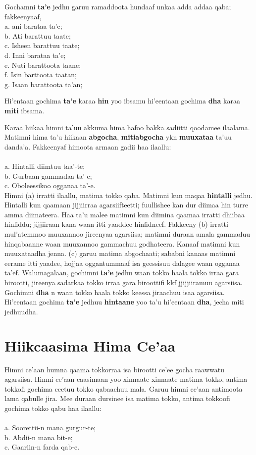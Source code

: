 \documentclass[11pt,b5paper]{book}
\begin{document}
Gochamni \textbf{ta’e} jedhu garuu ramaddoota hundaaf unkaa adda
addaa qaba; fakkeenyaaf,\\
a. ani barataa ta'e;\\
b. Ati barattuu taate;\\
c. Isheen barattuu taate;\\
d. Inni barataa ta'e;\\
e. Nuti barattoota taane;\\
f. Isin barttoota taatan;\\
g. Isaan barattoota ta'an;

 
Hi'entaan gochima \textbf{ta’e} karaa \textbf{hin} yoo ibsamu hi'eentaan gochima \textbf{dha} karaa \textbf{miti} ibsama. 

Karaa hiikaa himni ta’uu akkuma hima hafoo bakka sadiitti qoodamee ilaalama. Matimni hima ta’u hiikaan \textbf{abgocha}, \textbf{mitiabgocha} ykn \textbf{muuxataa} ta’uu danda’a. Fakkeenyaf himoota
armaan gadii haa ilaallu:  \\
\\
a. Hintalli diimtuu taa’-te;\\
b. Gurbaan gammadaa ta’-e;\\
c. Oboleessikoo ogganaa ta’-e.\\

Himni (a) irratti ilaallu, matima tokko qaba. Matimni kun maqaa \textbf{hintalli} jedhu. Hintalli kun qaamaan jijjiirraa agarsiifteetti; fuullishee kan dur diimaa hin turre amma diimateera. Haa ta’u malee matimni kun diimina qaamaa irratti dhiibaa hinfiddu; jijjiiraan kana waan itti yaaddee hinfidneef. Fakkeeny (b) irratti mul’atemmoo muuxannoo jireenyaa agarsiisa; matimni duraan amala gammaduu hinqabaanne waan muuxannoo gammachuu godhateera. Kanaaf matimni kun muuxataadha jenna. (c) garuu matima abgochaati; sababni kanaas matimni eerame itti yaadee, hojjaa oggantummaaf isa geessisuu dalagee waan ogganaa ta’ef. Walumagalaan, gochimni \textbf{ta’e} jedhu waan tokko haala tokko irraa gara birootti, jireenya sadarkaa tokko irraa gara biroottifi kkf jjijjiiramuu agarsiisa. Gochimni \textbf{dha} n waan
tokko haala tokko keessa jiraachuu isaa agarsiisa. Hi'eentaan gochima \textbf{ta’e} jedhuu \textbf{hintaane} yoo ta’u hi'eentaan \textbf{dha}, jecha miti jedhuudha.

\section{Hiikcaasima Hima Ce'aa}

Himni ce’aan humna qaama tokkorraa isa birootti ce’ee gocha raawwatu agarsiisa. Himni ce’aan caasimaan yoo xinnaate xinnaate matima tokko, antima tokkofi gochima ceetuu tokko qabaachuu mala. Garuu himni ce’aan antimoota lama qabulle jira. Mee duraan dursinee isa matima tokko, antima tokkoofi
gochima tokko qabu haa ilaallu: \\
\\
a. Soorettii-n mana gurgur-te;\\
b. Abdii-n mana bit-e;\\
c. Gaariin-n farda qab-e.\\
\end{document}
